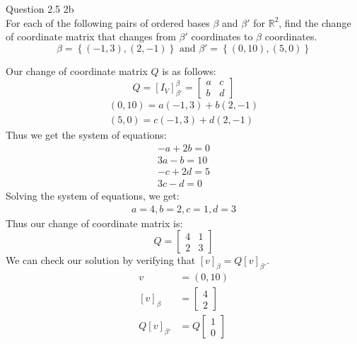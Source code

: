 \documentclass[answers,12pt,addpoints]{exam}
\begin{document}
\begin{questions}
    \question Question 2.5 2b\\
    For each of the following pairs of ordered bases $\beta$ and $\beta'$ for $\mathbb{R}^2$, find the change of coordinate matrix that changes from $\beta'$ coordinates to $\beta$ coordinates. \\
    $$ \beta = \left\{ (-1,3), (2,-1)\right\} \text{ and } \beta' = \left\{ (0,10), (5,0)\right\}$$
    \begin{solution}
        Our change of coordinate matrix $Q$ is as follows:\\
        $$Q = [I_V]_{\beta'}^\beta = \begin{bmatrix}
            a & c\\
            b & d
        \end{bmatrix}$$
        \begin{align*}
            (0,10) = a(-1,3) + b(2,-1)\\
            (5,0) = c(-1,3) + d(2,-1)
        \end{align*}
        Thus we get the system of equations:
        \begin{align*}
            -a + 2b = 0\\
            3a - b = 10\\
            -c + 2d = 5\\
            3c - d = 0
        \end{align*}
        Solving the system of equations, we get:
        \begin{align*}
            a = 4, b = 2, c = 1, d = 3
        \end{align*}
        Thus our change of coordinate matrix is:
        $$Q = \begin{bmatrix}
            4 & 1\\
            2 & 3
        \end{bmatrix}$$
        We can check our solution by verifying that $[v]_{\beta} = Q[v]_{\beta'}$.
        \begin{align*}
            v &= (0,10)\\
            [v]_{\beta} &= \begin{bmatrix}
                4\\
                2
            \end{bmatrix}   \\
            Q[v]_{\beta'} &= Q\begin{bmatrix}
                1\\
                0
            \end{bmatrix}\\

\end{align*}
\end{solution}
\end{questions}
\end{document}
